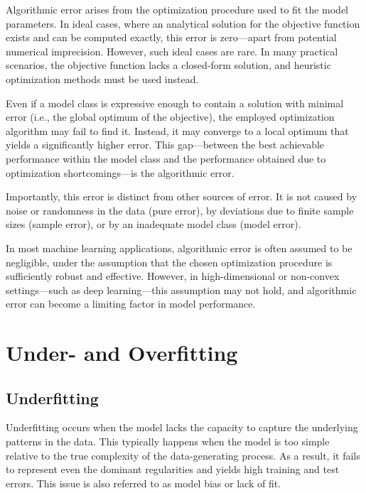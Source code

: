\documentclass[12pt,openany]{book}
\begin{document}
Algorithmic error arises from the optimization procedure used to fit the model parameters. In ideal cases, where an analytical solution for the objective function exists and can be computed exactly, this error is zero—apart from potential numerical imprecision. However, such ideal cases are rare. In many practical scenarios, the objective function lacks a closed-form solution, and heuristic optimization methods must be used instead. \newline

Even if a model class is expressive enough to contain a solution with minimal error (i.e., the global optimum of the objective), the employed optimization algorithm may fail to find it. Instead, it may converge to a local optimum that yields a significantly higher error. This gap—between the best achievable performance within the model class and the performance obtained due to optimization shortcomings—is the algorithmic error. \newline

Importantly, this error is distinct from other sources of error. It is not caused by noise or randomness in the data (pure error), by deviations due to finite sample sizes (sample error), or by an inadequate model class (model error). \newline

In most machine learning applications, algorithmic error is often assumed to be negligible, under the assumption that the chosen optimization procedure is sufficiently robust and effective. However, in high-dimensional or non-convex settings—such as deep learning—this assumption may not hold, and algorithmic error can become a limiting factor in model performance.



\section{Under- and Overfitting}


\subsection{Underfitting}

Underfitting occurs when the model lacks the capacity to capture the underlying patterns in the data. This typically happens when the model is too simple relative to the true complexity of the data-generating process. As a result, it fails to represent even the dominant regularities and yields high training and test errors. This issue is also referred to as model bias or lack of fit. \newline
\end{document}
